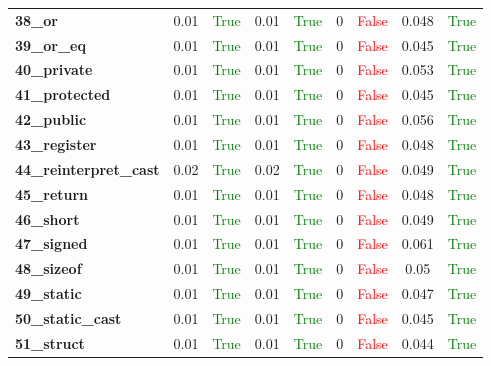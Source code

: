 \documentclass{article}
\begin{document}
\begin{xltabular}{\textwidth}{lcccccccc}
\textbf{38\_or}& 0.01&\textcolor{green}{True}& 0.01&\textcolor{green}{True}& 0&\textcolor{red}{False}& 0.048&\textcolor{green}{True} \\[0.5ex]
\textbf{39\_or\_eq}& 0.01&\textcolor{green}{True}& 0.01&\textcolor{green}{True}& 0&\textcolor{red}{False}& 0.045&\textcolor{green}{True} \\[0.5ex]
\textbf{40\_private}& 0.01&\textcolor{green}{True}& 0.01&\textcolor{green}{True}& 0&\textcolor{red}{False}& 0.053&\textcolor{green}{True} \\[0.5ex]
\textbf{41\_protected}& 0.01&\textcolor{green}{True}& 0.01&\textcolor{green}{True}& 0&\textcolor{red}{False}& 0.045&\textcolor{green}{True} \\[0.5ex]
\textbf{42\_public}& 0.01&\textcolor{green}{True}& 0.01&\textcolor{green}{True}& 0&\textcolor{red}{False}& 0.056&\textcolor{green}{True} \\[0.5ex]
\textbf{43\_register}& 0.01&\textcolor{green}{True}& 0.01&\textcolor{green}{True}& 0&\textcolor{red}{False}& 0.048&\textcolor{green}{True} \\[0.5ex]
\textbf{44\_reinterpret\_cast}& 0.02&\textcolor{green}{True}& 0.02&\textcolor{green}{True}& 0&\textcolor{red}{False}& 0.049&\textcolor{green}{True} \\[0.5ex]
\textbf{45\_return}& 0.01&\textcolor{green}{True}& 0.01&\textcolor{green}{True}& 0&\textcolor{red}{False}& 0.048&\textcolor{green}{True} \\[0.5ex]
\textbf{46\_short}& 0.01&\textcolor{green}{True}& 0.01&\textcolor{green}{True}& 0&\textcolor{red}{False}& 0.049&\textcolor{green}{True} \\[0.5ex]
\textbf{47\_signed}& 0.01&\textcolor{green}{True}& 0.01&\textcolor{green}{True}& 0&\textcolor{red}{False}& 0.061&\textcolor{green}{True} \\[0.5ex]
\textbf{48\_sizeof}& 0.01&\textcolor{green}{True}& 0.01&\textcolor{green}{True}& 0&\textcolor{red}{False}& 0.05&\textcolor{green}{True} \\[0.5ex]
\textbf{49\_static}& 0.01&\textcolor{green}{True}& 0.01&\textcolor{green}{True}& 0&\textcolor{red}{False}& 0.047&\textcolor{green}{True} \\[0.5ex]
\textbf{50\_static\_cast}& 0.01&\textcolor{green}{True}& 0.01&\textcolor{green}{True}& 0&\textcolor{red}{False}& 0.045&\textcolor{green}{True} \\[0.5ex]
\textbf{51\_struct}& 0.01&\textcolor{green}{True}& 0.01&\textcolor{green}{True}& 0&\textcolor{red}{False}& 0.044&\textcolor{green}{True} \\[0.5ex]

\end{xltabular}
\end{document}
